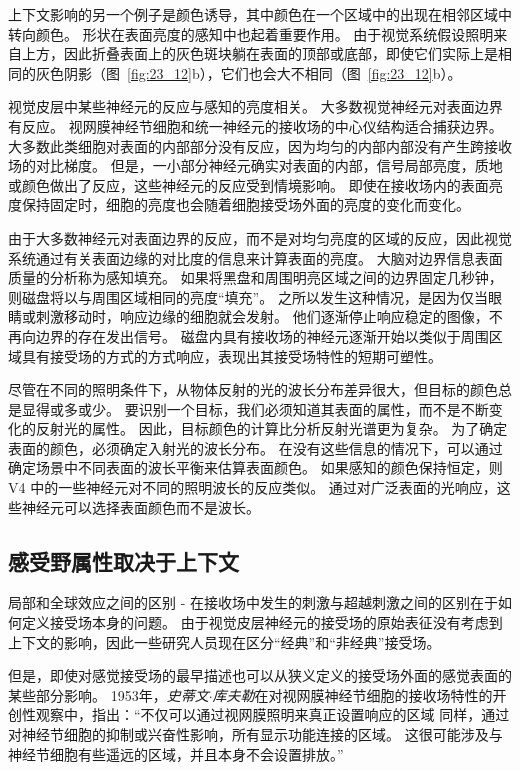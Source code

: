 上下文影响的另一个例子是颜色诱导，其中颜色在一个区域中的出现在相邻区域中转向颜色。
形状在表面亮度的感知中也起着重要作用。
由于视觉系统假设照明来自上方，因此折叠表面上的灰色斑块躺在表面的顶部或底部，即使它们实际上是相同的灰色阴影（图~\ref{fig:23_12}b），它们也会大不相同（图~\ref{fig:23_12}b）。


视觉皮层中某些神经元的反应与感知的亮度相关。
大多数视觉神经元对表面边界有反应。
视网膜神经节细胞和统一神经元的接收场的中心仪结构适合捕获边界。
大多数此类细胞对表面的内部部分没有反应，因为均匀的内部内部没有产生跨接收场的对比梯度。
但是，一小部分神经元确实对表面的内部，信号局部亮度，质地或颜色做出了反应，这些神经元的反应受到情境影响。
即使在接收场内的表面亮度保持固定时，细胞的亮度也会随着细胞接受场外面的亮度的变化而变化。


由于大多数神经元对表面边界的反应，而不是对均匀亮度的区域的反应，因此视觉系统通过有关表面边缘的对比度的信息来计算表面的亮度。
大脑对边界信息表面质量的分析称为感知填充。
如果将黑盘和周围明亮区域之间的边界固定几秒钟，则磁盘将以与周围区域相同的亮度“填充”。
之所以发生这种情况，是因为仅当眼睛或刺激移动时，响应边缘的细胞就会发射。
他们逐渐停止响应稳定的图像，不再向边界的存在发出信号。
磁盘内具有接收场的神经元逐渐开始以类似于周围区域具有接受场的方式的方式响应，表现出其接受场特性的短期可塑性。


尽管在不同的照明条件下，从物体反射的光的波长分布差异很大，但目标的颜色总是显得或多或少。
要识别一个目标，我们必须知道其表面的属性，而不是不断变化的反射光的属性。
因此，目标颜色的计算比分析反射光谱更为复杂。
为了确定表面的颜色，必须确定入射光的波长分布。
在没有这些信息的情况下，可以通过确定场景中不同表面的波长平衡来估算表面颜色。
如果感知的颜色保持恒定，则 V4 中的一些神经元对不同的照明波长的反应类似。
通过对广泛表面的光响应，这些神经元可以选择表面颜色而不是波长。



\subsection{感受野属性取决于上下文}

局部和全球效应之间的区别 - 在接收场中发生的刺激与超越刺激之间的区别在于如何定义接受场本身的问题。
由于视觉皮层神经元的接受场的原始表征没有考虑到上下文的影响，因此一些研究人员现在区分“经典”和“非经典”接受场。


但是，即使对感觉接受场的最早描述也可以从狭义定义的接受场外面的感觉表面的某些部分影响。
1953年，\textit{史蒂文$\cdot$库夫勒}在对视网膜神经节细胞的接收场特性的开创性观察中，指出：“不仅可以通过视网膜照明来真正设置响应的区域 同样，通过对神经节细胞的抑制或兴奋性影响，所有显示功能连接的区域。
这很可能涉及与神经节细胞有些遥远的区域，并且本身不会设置排放。”


